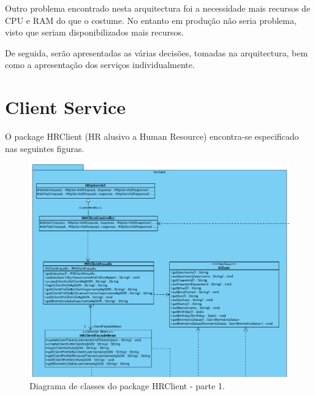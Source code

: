 \hspace{5mm} Outro problema encontrado nesta arquitectura foi a necessidade mais recursos de CPU e RAM do que o costume. No entanto em produção não seria problema, visto que seriam disponibilizados mais recursos. 

\hspace{5mm} De seguida, serão apresentadas as várias decisões, tomadas na arquitectura, bem como a apresentação dos serviços individualmente.

\section{Client Service}

\hspace{5mm} O package HRClient (HR alusivo a Human Resource) encontra-se especificado nas seguintes figuras.

\begin{figure}[H]
    \centering
    \includegraphics[scale=0.575]{images/arquitetura/client-package-1.png}
    \caption{Diagrama de classes do package HRClient - parte 1.}
    \label{fig:interfaceperfilptbycliente}
\end{figure}


